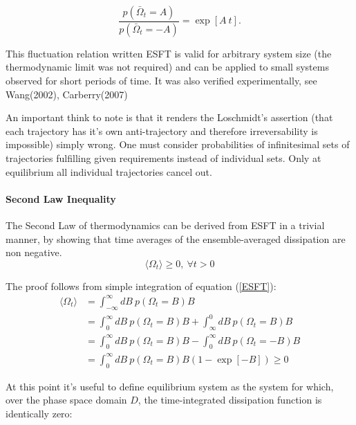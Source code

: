 \documentclass[a4paper,12pt,nofootinbib]{article}
\begin{document}
\begin{equation}
\label{ESFT}
  \frac{p(\bar{\Omega}_t=A)}{p(\bar{\Omega}_t=-A)}=\exp[A\ t].
\end{equation}

This fluctuation relation written ESFT is valid for arbitrary system size (the thermodynamic limit was not required) and can be applied to small systems observed for short periods of time.
It was also verified experimentally, see Wang(2002)\cite{Wang:2002hw}, Carberry(2007)\cite{Carberry:2007be}

An important think to note is that it renders the Loschmidt's assertion (that each trajectory has it's own anti-trajectory and therefore irreversability is impossible) simply wrong. One must consider probabilities of infinitesimal sets of trajectories fulfilling given requirements instead of individual sets. Only at equilibrium all individual trajectories cancel out.

\paragraph{Second Law Inequality}
The Second Law of thermodynamics can be derived from ESFT in a trivial manner, by showing that time averages of the ensemble-averaged dissipation are non negative.
\begin{equation}
  \langle\Omega_t\rangle\geq 0,\  \forall t > 0
\end{equation}

 The proof follows from simple integration of equation (\ref{ESFT}):
\begin{equation}
\begin{aligned}
  \langle \Omega_t \rangle &= \int_{-\infty}^{\infty} dB\ p(\Omega_t=B)B\\
  &=\int_0^{\infty} dB\ p(\Omega_t=B)B +\int_{\infty}^{0} dB\ p(\Omega_t=B)B \\
  &=\int_0^{\infty} dB\ p(\Omega_t=B)B -\int_{0}^{\infty} dB\ p(\Omega_t=-B)B \\
  &= \int_0^{\infty} dB\ p(\Omega_t=B)B(1-\exp[-B]) \geq 0 
\end{aligned}
\end{equation} 

At this point it's useful to define equilibrium system as the system for which, over the phase space domain $D$, the time-integrated dissipation function is identically zero:
\end{document}
